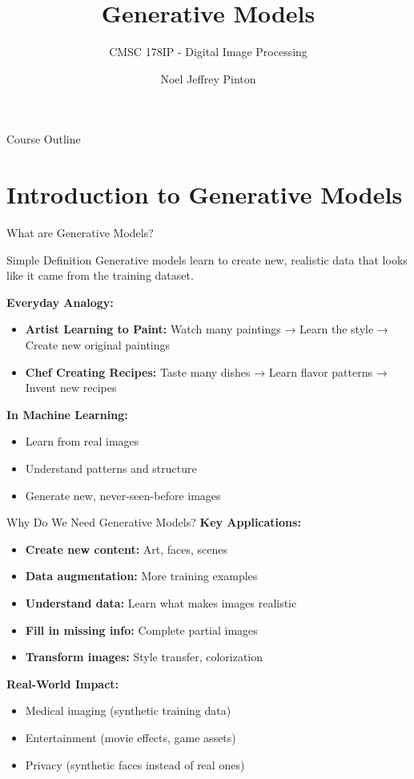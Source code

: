 \documentclass[aspectratio=169,10pt]{beamer}
\title{Generative Models}
\subtitle{CMSC 178IP - Digital Image Processing}
\author{Noel Jeffrey Pinton}
\institute{University of the Philippines - Cebu\\Department of Computer Science}
\date{}
\begin{document}
\begin{frame}
\titlepage
\end{frame}

\begin{frame}{Course Outline}
\tableofcontents
\end{frame}

\section{Introduction to Generative Models}

\begin{frame}{What are Generative Models?}
\begin{alertblock}{Simple Definition}
Generative models learn to create new, realistic data that looks like it came from the training dataset.
\end{alertblock}

\textbf{Everyday Analogy:}
\begin{itemize}
\item \textbf{Artist Learning to Paint:} Watch many paintings → Learn the style → Create new original paintings
\item \textbf{Chef Creating Recipes:} Taste many dishes → Learn flavor patterns → Invent new recipes
\end{itemize}

\textbf{In Machine Learning:}
\begin{itemize}
\item Learn from real images
\item Understand patterns and structure
\item Generate new, never-seen-before images
\end{itemize}
\end{frame}

\begin{frame}{Why Do We Need Generative Models?}
\textbf{Key Applications:}
\begin{itemize}
\item \textbf{Create new content:} Art, faces, scenes
\item \textbf{Data augmentation:} More training examples
\item \textbf{Understand data:} Learn what makes images realistic
\item \textbf{Fill in missing info:} Complete partial images
\item \textbf{Transform images:} Style transfer, colorization
\end{itemize}

\textbf{Real-World Impact:}
\begin{itemize}
\item Medical imaging (synthetic training data)
\item Entertainment (movie effects, game assets)
\item Privacy (synthetic faces instead of real ones)
\end{itemize}
\end{frame}
\end{document}
